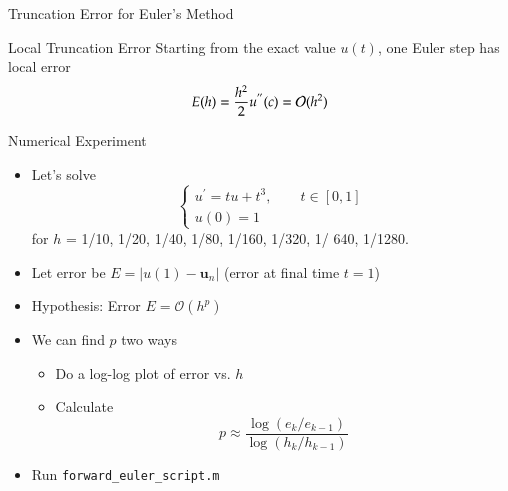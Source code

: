 \documentclass[10pt]{beamer}
\begin{document}
\begin{frame}{Truncation Error for Euler's Method}
\begin{block}{Local Truncation Error}
    Starting from the exact value $u(t)$, one Euler step has local error 
        $$E (h) = \frac{h^2}{2} u^{''}(c) = {\mathcal{O}}(h^2)$$
\end{block}

\vspace{5mm}

\vspace{3mm}

\end{frame}
\begin{frame}{Numerical Experiment}
\begin{itemize}
    \item Let's solve 
        \[
        \begin{cases}
        u^\prime = tu + t^3, \qquad t \in [0,1]\\
        u(0) = 1
        \end{cases}
        \]
        for $h$ = 1/10, 1/20, 1/40, 1/80, 1/160, 1/320, 1/ 640, 1/1280.\\[4mm]

    \item Let error be $E = \left|u(1) - \textbf{u}_n\right|$ (error at final time $t=1$)\\[4mm]
        
    \item Hypothesis: Error $E = \mathcal{O}(h^p)$\\[4mm]

    \item We can find $p$ two ways 
        \begin{itemize}
            \item Do a log-log plot of error vs. $h$
            \item Calculate 
                \[
                p \approx \frac{\log(e_{k}/e_{k-1})}{\log(h_k/h_{k-1})}
                \]
        \end{itemize}

    \item Run \texttt{forward\_euler\_script.m}

\end{itemize}
\end{frame}
\end{document}
